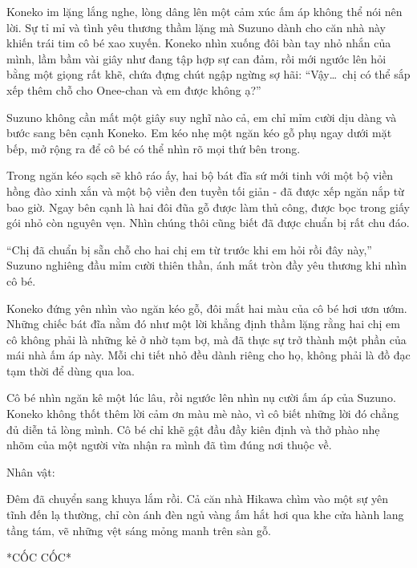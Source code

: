 ﻿\documentclass[../main.tex]{subfiles}
\begin{document}
Koneko im lặng lắng nghe, lòng dâng lên một cảm xúc ấm áp không thể nói nên lời. Sự tỉ mỉ và tình yêu thương thầm lặng mà Suzuno dành cho căn nhà này khiến trái tim cô bé xao xuyến. Koneko nhìn xuống đôi bàn tay nhỏ nhắn của mình, lầm bầm vài giây như đang tập hợp sự can đảm, rồi mới ngước lên hỏi bằng một giọng rất khẽ, chứa đựng chút ngập ngừng sợ hãi: ``Vậy\dots\ chị có thể sắp xếp thêm chỗ cho Onee-chan và em được không ạ?''

Suzuno không cần mất một giây suy nghĩ nào cả, em chỉ mỉm cười dịu dàng và bước sang bên cạnh Koneko. Em kéo nhẹ một ngăn kéo gỗ phụ ngay dưới mặt bếp, mở rộng ra để cô bé có thể nhìn rõ mọi thứ bên trong.

Trong ngăn kéo sạch sẽ khô ráo ấy, hai bộ bát đĩa sứ mới tinh với một bộ viền hồng đào xinh xắn và một bộ viền đen tuyền tối giản - đã được xếp ngăn nắp từ bao giờ. Ngay bên cạnh là hai đôi đũa gỗ được làm thủ công, được bọc trong giấy gói nhỏ còn nguyên vẹn. Nhìn chúng thôi cũng biết đã được chuẩn bị rất chu đáo.

``Chị đã chuẩn bị sẵn chỗ cho hai chị em từ trước khi em hỏi rồi đây này,'' Suzuno nghiêng đầu mỉm cười thiên thần, ánh mắt tròn đầy yêu thương khi nhìn cô bé.

Koneko đứng yên nhìn vào ngăn kéo gỗ, đôi mắt hai màu của cô bé hơi ươn ướm. Những chiếc bát đĩa nằm đó như một lời khẳng định thầm lặng rằng hai chị em cô không phải là những kẻ ở nhờ tạm bợ, mà đã thực sự trở thành một phần của mái nhà ấm áp này. Mỗi chi tiết nhỏ đều dành riêng cho họ, không phải là đồ đạc tạm thời để dùng qua loa.

Cô bé nhìn ngăn kê một lúc lâu, rồi ngước lên nhìn nụ cười ấm áp của Suzuno. Koneko không thốt thêm lời cảm ơn màu mè nào, vì cô biết những lời đó chẳng đủ diễn tả lòng mình. Cô bé chỉ khẽ gật đầu đầy kiên định và thở phào nhẹ nhõm của một người vừa nhận ra mình đã tìm đúng nơi thuộc về.

\newpage

\begin{center}
    {\caviar\fontsize{12pt}{12pt}\selectfont Nhân vật:   }
\end{center}

Đêm đã chuyển sang khuya lắm rồi. Cả căn nhà Hikawa chìm vào một sự yên tĩnh đến lạ thường, chỉ còn ánh đèn ngủ vàng ấm hắt hơi qua khe cửa hành lang tầng tám, vẽ những vệt sáng mỏng manh trên sàn gỗ.

*CỐC CỐC*
\end{document}
